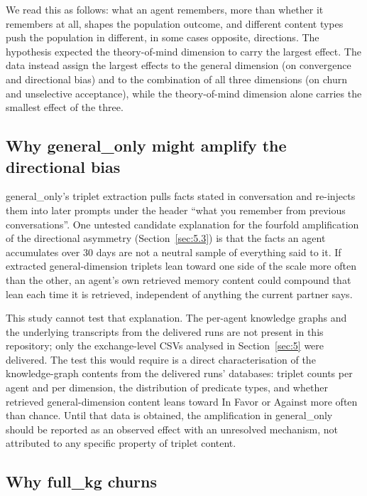 \documentclass[11pt,a4paper]{article}
\newcommand{\src}[1]{\unskip\marginpar{\raggedright\tiny\textcolor{gray}{#1}}}
\newcommand{\src}[1]{\unskip}
\newcommand{\cond}[1]{\textsf{#1}}
\begin{document}
We read this as follows: what an agent remembers, more than whether it remembers at all, shapes the population outcome, and different content types push the population in different, in some cases opposite, directions. The hypothesis expected the theory-of-mind dimension to carry the largest effect. The data instead assign the largest effects to the general dimension (on convergence and directional bias) and to the combination of all three dimensions (on churn and unselective acceptance), while the theory-of-mind dimension alone carries the smallest effect of the three.

\subsection{Why \cond{general\_only} might amplify the directional bias}\label{sec:6.2}

\cond{general\_only}'s triplet extraction pulls facts stated in conversation and re-injects them into later prompts under the header ``what you remember from previous conversations''\src{methodology\_facts.md, "Prompts and the stance scale"}. One untested candidate explanation for the fourfold amplification of the directional asymmetry (Section~\ref{sec:5.3}) is that the facts an agent accumulates over 30 days are not a neutral sample of everything said to it. If extracted general-dimension triplets lean toward one side of the scale more often than the other, an agent's own retrieved memory content could compound that lean each time it is retrieved, independent of anything the current partner says.

This study cannot test that explanation. The per-agent knowledge graphs and the underlying transcripts from the delivered runs are not present in this repository; only the exchange-level CSVs analysed in Section~\ref{sec:5} were delivered. The test this would require is a direct characterisation of the knowledge-graph contents from the delivered runs' databases: triplet counts per agent and per dimension, the distribution of predicate types, and whether retrieved general-dimension content leans toward In Favor or Against more often than chance. Until that data is obtained, the amplification in \cond{general\_only} should be reported as an observed effect with an unresolved mechanism, not attributed to any specific property of triplet content.

\subsection{Why \cond{full\_kg} churns}\label{sec:6.3}
\end{document}
